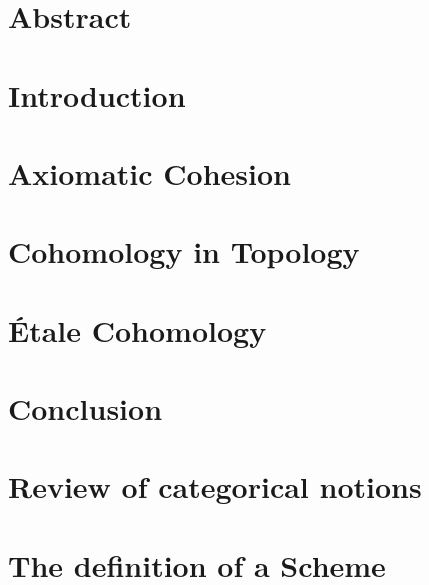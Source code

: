 \documentclass[11pt]{memoir}
\begin{document}
  \chapter*{Abstract}
  
  
  \tableofcontents

  \chapter{Introduction}
  

  \chapter{Axiomatic Cohesion}
  

  \chapter{Cohomology in Topology}
  

  \chapter{\'Etale Cohomology}
  

  \chapter{Conclusion}
  

  \appendix
  \chapter{Review of categorical notions}
  
  \chapter{The definition of a Scheme}
  

  
  
\end{document}
